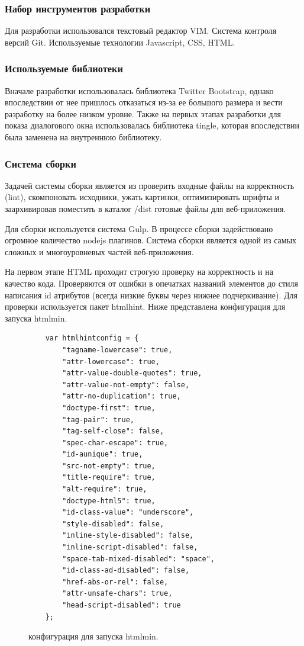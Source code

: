 \subsubsection{Набор инструментов разработки}
Для разработки использовался текстовый редактор VIM. Система контроля версий Git. Используемые технологии Javascript, CSS, HTML.

\subsubsection{Используемые библиотеки}
Вначале разработки использовалась библиотека Twitter Bootstrap, однако впоследствии от нее пришлось отказаться из-за ее большого размера и вести разработку на более низком уровне.
Также на первых этапах разработки для показа диалогового окна использовалась библиотека tingle, которая впоследствии была заменена на внутреннюю библиотеку.

\subsubsection{Система сборки}
Задачей системы сборки является из проверить входные файлы на корректность (lint), скомпоновать исходники, ужать картинки, оптимизировать шрифты и заархивировав поместить в каталог /dist готовые файлы для веб-приложения.

Для сборки используется система Gulp. В процессе сборки задействовано огромное количество nodejs плагинов. 
Система сборки является одной из самых сложных и многоуровневых частей веб-приложения. 

На первом этапе HTML проходит строгую проверку на корректность и на качество кода. Проверяются от ошибки в опечатках названий элементов до стиля написания id атрибутов (всегда низкие буквы через нижнее подчеркивание). Для проверки используется пакет htmlhint. 
Ниже представлена конфигурация для запуска htmlmin.



\begin{figure}[h!]
    \centering

\begin{small}
\begin{verbatim}
    var htmlhintconfig = {
        "tagname-lowercase": true,
        "attr-lowercase": true,
        "attr-value-double-quotes": true,
        "attr-value-not-empty": false,
        "attr-no-duplication": true,
        "doctype-first": true,
        "tag-pair": true,
        "tag-self-close": false,
        "spec-char-escape": true,
        "id-aunique": true,
        "src-not-empty": true,
        "title-require": true,
        "alt-require": true,
        "doctype-html5": true,
        "id-class-value": "underscore",
        "style-disabled": false,
        "inline-style-disabled": false,
        "inline-script-disabled": false,
        "space-tab-mixed-disabled": "space",
        "id-class-ad-disabled": false,
        "href-abs-or-rel": false,
        "attr-unsafe-chars": true,
        "head-script-disabled": true
    };
\end{verbatim}
\end{small}
    \caption{конфигурация для запуска htmlmin.}
\end{figure}


